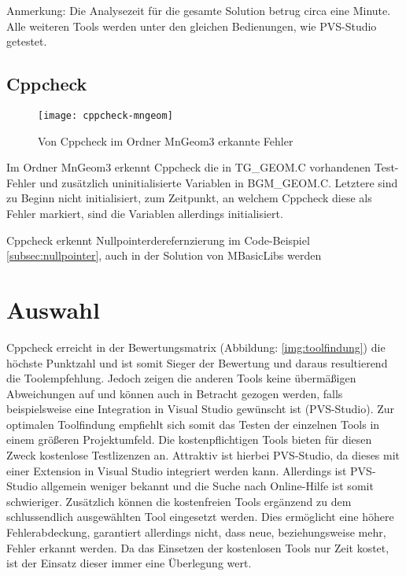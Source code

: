 Anmerkung: Die Analysezeit für die gesamte Solution betrug circa eine Minute. \newline
Alle weiteren Tools werden unter den gleichen Bedienungen, wie PVS-Studio getestet.

\subsection{Cppcheck}

\begin{figure}[htpb]
  \centering
  \texttt{[image: cppcheck-mngeom]}
  \caption{Von Cppcheck im Ordner MnGeom3 erkannte Fehler}
  \label{img:pvs-tg-geom}
\end{figure}

Im Ordner \glqq{}MnGeom3\grqq{} erkennt Cppcheck die in \glqq{}TG\_GEOM.C\grqq{} vorhandenen Test-Fehler und zusätzlich uninitialisierte Variablen in \glqq{}BGM\_GEOM.C\grqq{}. Letztere
sind zu Beginn nicht initialisiert, zum Zeitpunkt, an welchem Cppcheck diese als Fehler markiert, sind die Variablen allerdings initialisiert. \newline

Cppcheck erkennt Nullpointerderefernzierung im Code-Beispiel \ref{subsec:nullpointer}, auch in der Solution von MBasicLibs werden

\section{Auswahl}
\label{sec:auswahl}

Cppcheck erreicht in der Bewertungsmatrix (Abbildung: \ref{img:toolfindung}) die höchste Punktzahl und ist somit Sieger der Bewertung und daraus resultierend die Toolempfehlung.
Jedoch zeigen die anderen Tools keine übermäßigen Abweichungen auf und können auch in Betracht gezogen werden, falls beispielsweise eine Integration in Visual Studio gewünscht ist
(PVS-Studio). \newline
Zur optimalen Toolfindung empfiehlt sich somit das Testen der einzelnen Tools in einem größeren Projektumfeld. Die kostenpflichtigen Tools bieten für diesen Zweck kostenlose
Testlizenzen an. Attraktiv ist hierbei PVS-Studio, da dieses mit einer Extension in Visual Studio integriert werden kann. Allerdings ist PVS-Studio allgemein weniger bekannt und die Suche nach Online-Hilfe ist somit schwieriger. \newline
Zusätzlich können die kostenfreien Tools ergänzend zu dem schlussendlich ausgewählten Tool eingesetzt werden. Dies ermöglicht eine höhere Fehlerabdeckung, garantiert allerdings nicht,
dass neue, beziehungsweise mehr, Fehler erkannt werden. Da das Einsetzen der kostenlosen Tools nur Zeit kostet, ist der Einsatz dieser immer eine Überlegung wert.